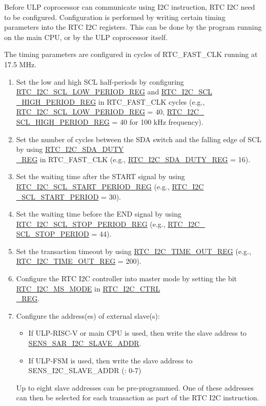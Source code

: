 \documentclass[main\_\_EN.tex]{subfiles}
\begin{document}
Before ULP coprocessor can communicate using I2C instruction, RTC I2C need to be configured. Configuration is performed by writing certain timing parameters into the RTC I2C registers. This can be done by the program running on the main CPU, or by the ULP coprocessor itself.
\begin{tiplisting}
The timing parameters are configured in cycles of RTC\_FAST\_CLK running at 17.5 MHz.
\end{tiplisting}
\begin{enumerate}
    \item Set the low and high SCL half-periods by configuring \hyperref[fielddesc:RTCI2CSCLLOWPERIODREG]{RTC\_I2C\_SCL\_LOW\_PERIOD\_REG} and \hyperref[fielddesc:RTCI2CSCLHIGHPERIODREG]{RTC\_I2C\_SCL\\\_HIGH\_PERIOD\_REG} in RTC\_FAST\_CLK cycles (e.g., \hyperref[fielddesc:RTCI2CSCLLOWPERIODREG]{RTC\_I2C\_SCL\_LOW\_PERIOD\_REG} = 40, \hyperref[fielddesc:RTCI2CSCLHIGHPERIODREG]{RTC\_I2C\_\\SCL\_HIGH\_PERIOD\_REG} = 40 for 100 kHz frequency).
    \item Set the number of cycles between the SDA switch and the falling edge of SCL by using \hyperref[regdesc:RTCI2CSDADUTYREG]{RTC\_I2C\_SDA\_DUTY\\\_REG} in RTC\_FAST\_CLK (e.g., \hyperref[regdesc:RTCI2CSDADUTYREG]{RTC\_I2C\_SDA\_DUTY\_REG} = 16).
    \item Set the waiting time after the START signal by using \hyperref[regdesc:RTCI2CSCLSTARTPERIODREG]{RTC\_I2C\_SCL\_START\_PERIOD\_REG} (e.g., \hyperref[fielddesc:RTCI2CSCLSTARTPERIOD]{RTC\_I2C\\\_SCL\_START\_PERIOD} = 30).
    \item Set the waiting time before the END signal by using \hyperref[regdesc:RTCI2CSCLSTOPPERIODREG]{RTC\_I2C\_SCL\_STOP\_PERIOD\_REG} (e.g., \hyperref[fielddesc:RTCI2CSCLSTOPPERIOD]{RTC\_I2C\_\\SCL\_STOP\_PERIOD} = 44).
    \item Set the transaction timeout by using  \hyperref[fielddesc:RTCI2CTIMEOUTREG]{RTC\_I2C\_TIME\_OUT\_REG} (e.g., \hyperref[fielddesc:RTCI2CTIMEOUTREG]{RTC\_I2C\_TIME\_OUT\_REG} = 200).
    \item Configure the RTC I2C controller into master mode by setting the bit \hyperref[fielddesc:RTCI2CMSMODE]{RTC\_I2C\_MS\_MODE} in \hyperref[regdesc:RTCI2CCTRLREG]{RTC\_I2C\_CTRL\\\_REG}.
    \item Configure the address(es) of external slave(s):
    \begin{itemize}
        \item If ULP-RISC-V or main CPU is used, then write the slave address to \hyperref[fielddesc:SENSSARI2CSLAVEADDR]{SENS\_SAR\_I2C\_SLAVE\_ADDR}.
        \item If ULP-FSM is used, then write the slave address to SENS\_I2C\_SLAVE\_ADDR (: 0-7)
    \end{itemize} 
    Up to eight slave addresses can be pre-programmed. One of these addresses can then be selected for each transaction as part of the RTC I2C instruction.
\end{enumerate}
\end{document}
